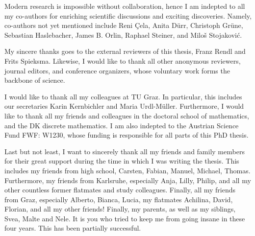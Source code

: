\documentclass[twoside,openright,bibliography=totoc]{scrreprt}
\begin{document}
Modern research is impossible without collaboration, hence I am indepted to all my co-authors for enriching scientific discussions and exciting discoveries. Namely, co-authors not yet mentioned include Reni \c{C}ela, Anita Dürr, Christoph Grüne, Sebastian Haslebacher, James B. Orlin, Raphael Steiner, and Milo\v{s} Stojakovi\'{c}.

My sincere thanks goes to the external reviewers of this thesis, Franz Rendl and Frits Spieksma. Likewise, I would like to thank all other anonymous reviewers, journal editors, and conference organizers, whose voluntary work forms the backbone of science.

I would like to thank all my colleagues at TU Graz. In particular, this includes our secretaries Karin Kernbichler and Maria Urdl-Müller. Furthermore, I would like to thank all my friends and colleagues in the doctoral school of mathematics, and the DK discrete mathematics. I am also indepted to the Austrian Science Fund FWF: W1230, whose funding is responsible for all parts of this PhD thesis.

Last but not least, I want to sincerely thank all my friends and family members for their great support during the time in which I was writing the thesis. 
This includes my friends from high school, Carsten, Fabian, Manuel, Michael, Thomas. 
Furthermore, my friends from Karlsruhe, especially Anja, Lilly, Philip, and all my other countless former flatmates and study colleagues. 
Finally, all my friends from Graz, especially Alberto, Bianca, Lucia, my flatmates Achilina, David, Florian, and all my other friends! 
Finally, my parents, as well as my siblings, Svea, Malte and Nele. It is you who tried to keep me from going insane in these four years. This has been partially successful.


\cleardoublepage

\setcounter{tocdepth}{1}
\tableofcontents























\end{document}
